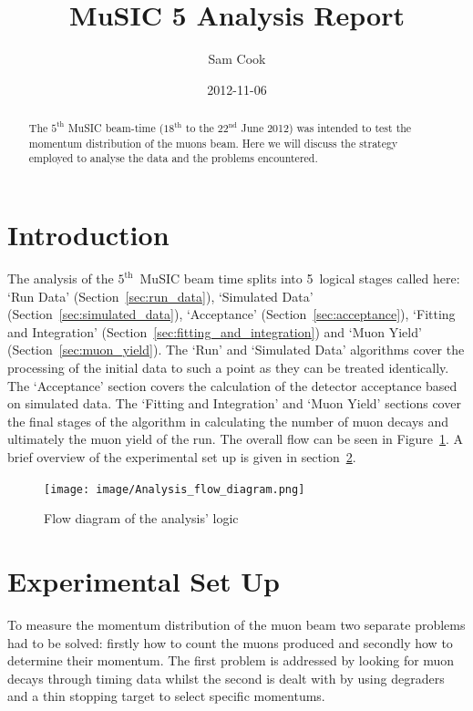 \documentclass[]{article}
\title{MuSIC 5 Analysis Report}
\author{Sam Cook}
\date{2012-11-06}
\newcommand{\nth}[1]{$#1^\text{th}$}
\newcommand{\nthTwo}[2]{$#1^\text{#2}$}
\begin{document}
\ifpdf
{}
\else
{}
\fi

\maketitle


\begin{abstract}
    The \nth{5} MuSIC beam-time (\nth{18} to the \nthTwo{22}{nd} June 2012) was intended to test the momentum distribution of the muons beam. Here we will discuss the strategy employed to analyse the data and the problems encountered.
\end{abstract}

\section{Introduction} %
\label{sec:introduction}
The analysis of the \nth{5}~MuSIC beam time splits into 5~logical stages called here: `Run Data' (Section~\ref{sec:run_data}), `Simulated Data' (Section~\ref{sec:simulated_data}), `Acceptance' (Section~\ref{sec:acceptance}), `Fitting and Integration' (Section~\ref{sec:fitting_and_integration}) and `Muon Yield' (Section~\ref{sec:muon_yield}). The `Run' and `Simulated Data' algorithms cover the processing of the initial data to such a point as they can be treated identically. The `Acceptance' section covers the calculation of the detector acceptance based on simulated data. The `Fitting and Integration' and `Muon Yield' sections cover the final stages of the algorithm in calculating the number of muon decays and ultimately the muon yield of the run. The overall flow can be seen in Figure~\ref{fig:analysis_flow_diagrm}. A brief overview of the experimental set up is given in section~\ref{sec:experimental_set_up}.

\begin{figure}[htbp]
    \centering
        \texttt{[image: image/Analysis\_flow\_diagram.png]}
    \caption{Flow diagram of the analysis' logic}
    \label{fig:analysis_flow_diagrm}
\end{figure}
\section{Experimental Set Up} %
\label{sec:experimental_set_up}
To measure the momentum distribution of the muon beam two separate problems had to be solved: firstly how to count the muons produced and secondly how to determine their momentum. The first problem is addressed by looking for muon decays through timing data whilst the second is dealt with by using degraders and a thin stopping target to select specific momentums. 
\end{document}
